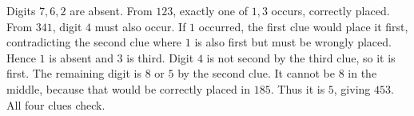 Digits $7,6,2$ are absent. From $123$, exactly one of $1,3$ occurs, correctly placed. From $341$, digit $4$ must also occur. If $1$ occurred, the first clue would place it first, contradicting the second clue where $1$ is also first but must be wrongly placed. Hence $1$ is absent and $3$ is third. Digit $4$ is not second by the third clue, so it is first. The remaining digit is $8$ or $5$ by the second clue. It cannot be $8$ in the middle, because that would be correctly placed in $185$. Thus it is $5$, giving $\boxed{453}$. All four clues check.
